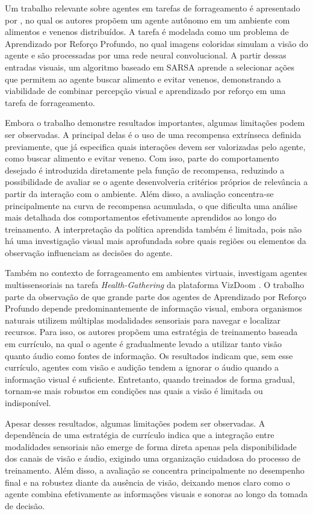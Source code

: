 Um trabalho relevante sobre agentes em tarefas de forrageamento é apresentado por , no qual os autores propõem um agente autônomo em um ambiente com alimentos e venenos distribuídos. A tarefa é modelada como um problema de Aprendizado por Reforço Profundo, no qual imagens coloridas simulam a visão do agente e são processadas por uma rede neural convolucional. A partir dessas entradas visuais, um algoritmo baseado em SARSA aprende a selecionar ações que permitem ao agente buscar alimento e evitar venenos, demonstrando a viabilidade de combinar percepção visual e aprendizado por reforço em uma tarefa de forrageamento.

Embora o trabalho demonstre resultados importantes, algumas limitações podem ser observadas. A principal delas é o uso de uma recompensa extrínseca definida previamente, que já especifica quais interações devem ser valorizadas pelo agente, como buscar alimento e evitar veneno. Com isso, parte do comportamento desejado é introduzida diretamente pela função de recompensa, reduzindo a possibilidade de avaliar se o agente desenvolveria critérios próprios de relevância a partir da interação com o ambiente. Além disso, a avaliação concentra-se principalmente na curva de recompensa acumulada, o que dificulta uma análise mais detalhada dos comportamentos efetivamente aprendidos ao longo do treinamento. A interpretação da política aprendida também é limitada, pois não há uma investigação visual mais aprofundada sobre quais regiões ou elementos da observação influenciam as decisões do agente.

Também no contexto de forrageamento em ambientes virtuais,  investigam agentes multissensoriais na tarefa \textit{Health-Gathering} da plataforma VizDoom \cite{vizdoom}. O trabalho parte da observação de que grande parte dos agentes de Aprendizado por Reforço Profundo depende predominantemente de informação visual, embora organismos naturais utilizem múltiplas modalidades sensoriais para navegar e localizar recursos. Para isso, os autores propõem uma estratégia de treinamento baseada em currículo, na qual o agente é gradualmente levado a utilizar tanto visão quanto áudio como fontes de informação. Os resultados indicam que, sem esse currículo, agentes com visão e audição tendem a ignorar o áudio quando a informação visual é suficiente. Entretanto, quando treinados de forma gradual, tornam-se mais robustos em condições nas quais a visão é limitada ou indisponível.

Apesar desses resultados, algumas limitações podem ser observadas. A dependência de uma estratégia de currículo indica que a integração entre modalidades sensoriais não emerge de forma direta apenas pela disponibilidade dos canais de visão e áudio, exigindo uma organização cuidadosa do processo de treinamento. Além disso, a avaliação se concentra principalmente no desempenho final e na robustez diante da ausência de visão, deixando menos claro como o agente combina efetivamente as informações visuais e sonoras ao longo da tomada de decisão.

